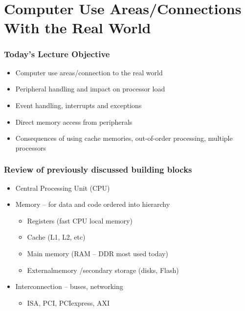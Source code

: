 \documentclass{beamer}
\subtitle{Lecture 09. External Events Processing}
\author{Pavel Píša \phantom{xxxxxxxxx} Petr Štěpán \\ \small\texttt{pisa@fel.cvut.cz}\phantom{xxxx}\small\texttt{stepan@fel.cvut.cz}}
\begin{document}
\maketitle

\section{Computer Use Areas/Connections With the Real World}

\begin{frame}
\frametitle{Today's Lecture Objective}

\begin{itemize}
 \item Computer use areas/connection to the real world
 \item Peripheral handling and impact on processor load
 \item Event handling, interrupts and exceptions
 \item Direct memory access from peripherals
 \item Consequences of using cache memories, out-of-order processing, multiple processors
\end{itemize}
\end{frame}

\begin{frame}
\frametitle{Review of previously discussed building blocks}

\begin{itemize}
 \item Central Processing Unit (CPU)
 \item Memory -- for data and code ordered into hierarchy
 \begin{itemize}
  \item Registers (fast CPU local memory)
  \item Cache (L1, L2, etc)
  \item Main memory (RAM -- DDR most used today)
  \item Externalmemory /secondary storage (disks, Flash)
 \end{itemize}
 \item Interconnection -- buses, networking
 \begin{itemize}
  \item ISA, PCI, PCIexpress, AXI
 \end{itemize}
\end{itemize}
\end{frame}
\end{document}

